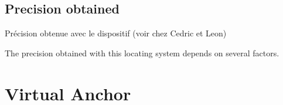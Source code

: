 \subsection{Precision obtained}

\color{red}
Précision obtenue avec le dispositif (voir chez Cedric et Leon)
\color{black}

The precision obtained with this locating system depends on several factors.

\section{Virtual Anchor}

